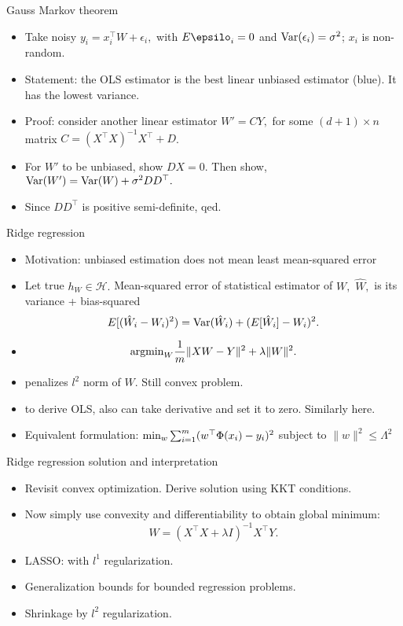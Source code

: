 \documentclass[final]{beamer}
\begin{document}
\begin{frame}{Gauss Markov theorem}
	\begin{itemize}
		\item Take noisy $y_i = x_i^\top W  + \epsilon_i,$ with $E\epsilo_i = 0$ and ${\rm Var}(\epsilon_i) = \sigma^2$; $x_i$ is non-random.
		\pause
		\item Statement: the OLS estimator is the best linear unbiased estimator (blue). It has the lowest variance.
		\pause
	\item Proof: consider another linear estimator $W' = C Y,$ for some $(d+1)\times n$ matrix $C =  (X^\top X)^{-1} X^\top + D$. 
	\pause 
	\item For $W'$ to be unbiased, show $DX = 0$. Then show, ${\rm Var}(W') = {\rm Var}(W) + \sigma^2 DD^\top.$
	\pause
	\item Since $DD^\top$ is positive semi-definite, qed.
	\end{itemize}
\end{frame}
\begin{frame}{Ridge regression}
	\begin{itemize}
		\item Motivation: unbiased estimation does not mean least mean-squared error
		\pause
	\item Let true $h_W \in \mathcal{H}.$ Mean-squared error of statistical estimator of $W,$ $\hat{W},$ is its variance + bias-squared
		$$E[(\hat{W}_i - W_i)^2) = {\rm Var}(\hat{W}_i) + (E[\hat{W}_i] - W_i)^2.$$
		\item 
	$$ {\rm arg min}_{W} \dfrac{1}{m} \|X W - Y\|^2 + \lambda \|W\|^2.$$
		\pause
	\item penalizes $l^2$ norm of $W$. Still convex problem.
	\pause 
	\item to derive OLS, also can take derivative and set it to zero. Similarly here.
	\pause
\item Equivalent formulation:
	$ {\rm min}_w \sum_{i=1}^m (w^\top \Phi(x_i) - y_i)^2$ subject to $\|w\|^2 \leq \Lambda^2$
	\end{itemize}
\end{frame}
\begin{frame}{Ridge regression solution and interpretation}
	\begin{itemize}
		\item Revisit convex optimization. Derive solution using KKT conditions.
		\pause
		\item Now simply use convexity and differentiability to obtain global minimum:
			$$W = (X^\top X + \lambda I)^{-1} X^\top Y.$$ 
		\pause
		\item LASSO: with $l^1$ regularization.
		\pause
		\item Generalization bounds for bounded regression problems.
		\pause 
	\item Shrinkage by $l^2$ regularization.
	\end{itemize}

\end{frame}
\end{document}
